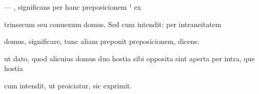 \fulllines{}

— , significans per hanc preposicionem ¹ ex

trinsecum seu conuexum domus. Sed cum intendit: per intraneitatem

domus, significare, tunc aliam preponit preposicionem, dicens: 




\fullpreviouslines
{
\color{blue}


ut dato, quod alicuius domus duo hostia sibi opposita sint aperta per intra, que hostia%

cum intendit, ut proiciatur, sic exprimit.

}



